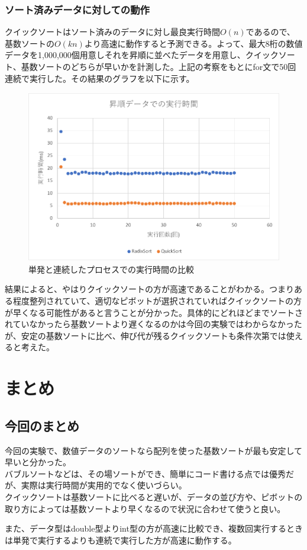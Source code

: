 \documentclass[a4j,dvipdfmx]{jsreport}
\begin{document}
\subsection{ソート済みデータに対しての動作}
クイックソートはソート済みのデータに対し最良実行時間$O(n)$であるので、基数ソートの$O(kn)$より高速に動作すると予測できる。よって、最大8桁の数値データを1,000,000個用意しそれを昇順に並べたデータを用意し、クイックソート、基数ソートのどちらが早いかを計測した。上記の考察をもとにfor文で50回連続で実行した。その結果のグラフを以下に示す。
 \begin{figure}[htbp]
    \centering
    \includegraphics[keepaspectratio,width=\linewidth]{figure6.pdf}
    \caption{単発と連続したプロセスでの実行時間の比較}
    \label{fig:RS1}
\end{figure}

結果によると、やはりクイックソートの方が高速であることがわかる。つまりある程度整列されていて、適切なピボットが選択されていればクイックソートの方が早くなる可能性があると言うことが分かった。具体的にどれほどまでソートされていなかったら基数ソートより遅くなるのかは今回の実験ではわからなかったが、安定の基数ソートに比べ、伸び代が残るクイックソートも条件次第では使えると考えた。

\chapter{まとめ}
\section{今回のまとめ}
今回の実験で、数値データのソートなら配列を使った基数ソートが最も安定して早いと分かった。\\バブルソートなどは、その場ソートができ、簡単にコード書ける点では優秀だが、実際は実行時間が実用的でなく使いづらい。\\クイックソートは基数ソートに比べると遅いが、データの並び方や、ピボットの取り方によっては基数ソートより早くなるので状況に合わせて使うと良い。\par
また、データ型はdouble型よりint型の方が高速に比較でき、複数回実行するときは単発で実行するよりも連続で実行した方が高速に動作する。
\end{document}
